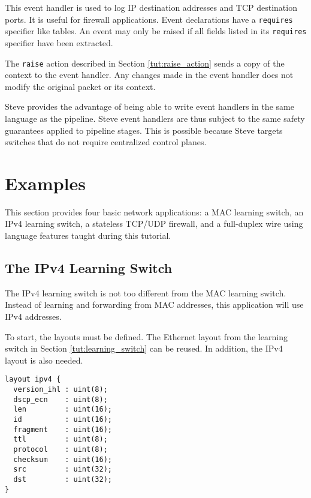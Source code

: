This event handler is used to log IP destination addresses and
TCP destination ports. It is useful for firewall applications.
Event declarations have a \texttt{requires} specifier
like tables. An event may only be raised if all fields listed in its
\texttt{requires} specifier have been extracted.

The \texttt{raise} action described in Section \ref{tut:raise_action}
sends a copy of the context to the event handler.
Any changes made in the event handler does not modify the
original packet or its context.

Steve provides the advantage of being able to write event handlers
in the same language as the pipeline. 
Steve event handlers are thus subject to the same safety
guarantees applied to pipeline stages.
This is possible because Steve targets switches that do not require
centralized control planes.

\section{Examples} \label{tut:examples}

This section provides four basic network applications: a MAC learning switch, an IPv4 learning switch, a stateless TCP/UDP firewall, and a
full-duplex wire using language features taught during this tutorial.

\subsection{The IPv4 Learning Switch} \label{tut:learning_router}

The IPv4 learning switch is not too different from the MAC learning switch. 
Instead of learning and forwarding from MAC addresses, this application will use 
IPv4 addresses.

To start, the layouts must be defined. The Ethernet layout
from the learning switch in Section \ref{tut:learning_switch} can be reused. 
In addition, the IPv4 layout is also needed.

\begin{codepage}
\begin{lstlisting}
layout ipv4 {
  version_ihl : uint(8);
  dscp_ecn    : uint(8);
  len         : uint(16);
  id          : uint(16);
  fragment    : uint(16);
  ttl         : uint(8);
  protocol    : uint(8);
  checksum    : uint(16);
  src         : uint(32);
  dst         : uint(32);
}
\end{lstlisting}
\end{codepage}

